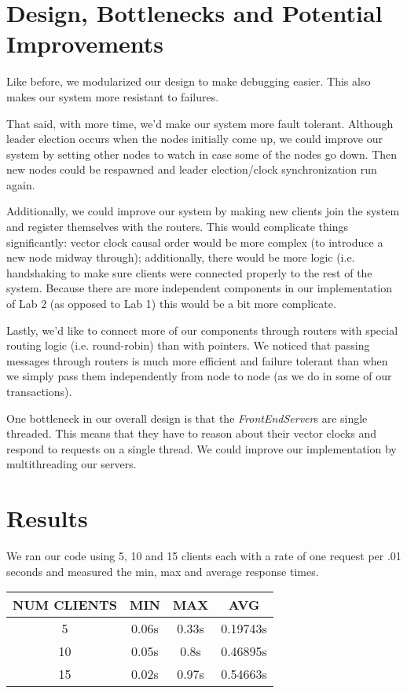 \documentclass[11pt]{article}
\begin{document}
\section{Design, Bottlenecks and Potential Improvements}
Like before, we modularized our design to make debugging easier.  This
also makes our system more resistant to failures.

That said, with more time, we'd make our system more fault
tolerant.  Although leader election occurs when the nodes initially
come up, we could improve our system by setting other nodes to watch
in case some of the nodes go down.  Then new nodes could be respawned
and leader election/clock synchronization run again.

Additionally, we could improve our system by making new clients join
the system and register themselves with the routers.  This would
complicate things significantly: vector clock causal order would be
more complex (to introduce a new node midway through); additionally,
there would be more logic (i.e. handshaking to make sure clients were
connected properly to the rest of the system.  Because there are more
independent components in our implementation of Lab 2 (as opposed to
Lab 1) this would be a bit more complicate.

Lastly, we'd like to connect more of our components through routers
with special routing logic (i.e. round-robin) than with pointers. We
noticed that passing messages through routers is much more efficient
and failure tolerant than when we simply pass them independently from
node to node (as we do in some of our transactions).

One bottleneck in our overall design is that the
\emph{FrontEndServer}s are single threaded.  This means that they have
to reason about their vector clocks and respond to requests on a single
thread.  We could improve our implementation by multithreading our servers.

\section{Results}
We ran our code using 5, 10 and 15 clients each with a rate of one
request per .01 seconds and measured the min, max and average response
times.

\begin{tabular}{c|c|c|c}
  NUM CLIENTS & MIN & MAX & AVG \\
  \hline
  5  & 0.06s & 0.33s & 0.19743s \\
  10 & 0.05s & 0.8s  & 0.46895s \\
  15 & 0.02s & 0.97s & 0.54663s \\
\end{tabular}
\end{document}
